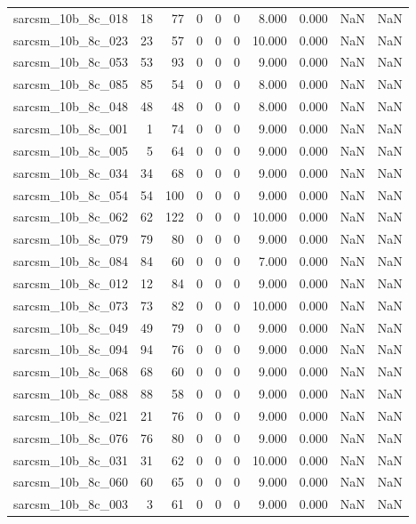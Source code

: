 \documentclass{article}
\begin{document}
\begin{longtable}{lrrrrrrrrr}
sarcsm\_10b\_8c\_018 & 18 & 77 & 0 & 0 & 0 & 8.000 & 0.000 & NaN & NaN \\
sarcsm\_10b\_8c\_023 & 23 & 57 & 0 & 0 & 0 & 10.000 & 0.000 & NaN & NaN \\
sarcsm\_10b\_8c\_053 & 53 & 93 & 0 & 0 & 0 & 9.000 & 0.000 & NaN & NaN \\
sarcsm\_10b\_8c\_085 & 85 & 54 & 0 & 0 & 0 & 8.000 & 0.000 & NaN & NaN \\
sarcsm\_10b\_8c\_048 & 48 & 48 & 0 & 0 & 0 & 8.000 & 0.000 & NaN & NaN \\
sarcsm\_10b\_8c\_001 & 1 & 74 & 0 & 0 & 0 & 9.000 & 0.000 & NaN & NaN \\
sarcsm\_10b\_8c\_005 & 5 & 64 & 0 & 0 & 0 & 9.000 & 0.000 & NaN & NaN \\
sarcsm\_10b\_8c\_034 & 34 & 68 & 0 & 0 & 0 & 9.000 & 0.000 & NaN & NaN \\
sarcsm\_10b\_8c\_054 & 54 & 100 & 0 & 0 & 0 & 9.000 & 0.000 & NaN & NaN \\
sarcsm\_10b\_8c\_062 & 62 & 122 & 0 & 0 & 0 & 10.000 & 0.000 & NaN & NaN \\
sarcsm\_10b\_8c\_079 & 79 & 80 & 0 & 0 & 0 & 9.000 & 0.000 & NaN & NaN \\
sarcsm\_10b\_8c\_084 & 84 & 60 & 0 & 0 & 0 & 7.000 & 0.000 & NaN & NaN \\
sarcsm\_10b\_8c\_012 & 12 & 84 & 0 & 0 & 0 & 9.000 & 0.000 & NaN & NaN \\
sarcsm\_10b\_8c\_073 & 73 & 82 & 0 & 0 & 0 & 10.000 & 0.000 & NaN & NaN \\
sarcsm\_10b\_8c\_049 & 49 & 79 & 0 & 0 & 0 & 9.000 & 0.000 & NaN & NaN \\
sarcsm\_10b\_8c\_094 & 94 & 76 & 0 & 0 & 0 & 9.000 & 0.000 & NaN & NaN \\
sarcsm\_10b\_8c\_068 & 68 & 60 & 0 & 0 & 0 & 9.000 & 0.000 & NaN & NaN \\
sarcsm\_10b\_8c\_088 & 88 & 58 & 0 & 0 & 0 & 9.000 & 0.000 & NaN & NaN \\
sarcsm\_10b\_8c\_021 & 21 & 76 & 0 & 0 & 0 & 9.000 & 0.000 & NaN & NaN \\
sarcsm\_10b\_8c\_076 & 76 & 80 & 0 & 0 & 0 & 9.000 & 0.000 & NaN & NaN \\
sarcsm\_10b\_8c\_031 & 31 & 62 & 0 & 0 & 0 & 10.000 & 0.000 & NaN & NaN \\
sarcsm\_10b\_8c\_060 & 60 & 65 & 0 & 0 & 0 & 9.000 & 0.000 & NaN & NaN \\
sarcsm\_10b\_8c\_003 & 3 & 61 & 0 & 0 & 0 & 9.000 & 0.000 & NaN & NaN \\

\end{longtable}
\end{document}
